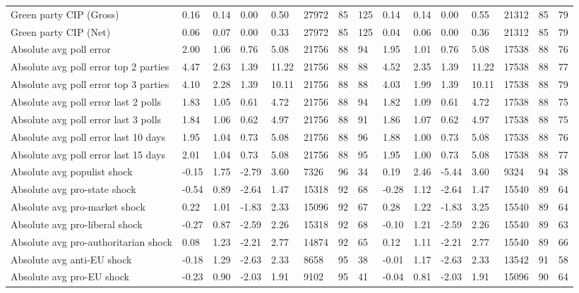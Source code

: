 \begin{longtable}{lllllllllllllll}
\addlinespace
Green party CIP (Gross) & 0.16 & 0.14 & 0.00 & 0.50 & 27972 & 85 & 125 & 0.14 & 0.14 & 0.00 & 0.55 & 21312 & 85 & 79\\
Green party CIP (Net) & 0.06 & 0.07 & 0.00 & 0.33 & 27972 & 85 & 125 & 0.04 & 0.06 & 0.00 & 0.36 & 21312 & 85 & 79\\
Absolute avg poll error & 2.00 & 1.06 & 0.76 & 5.08 & 21756 & 88 & 94 & 1.95 & 1.01 & 0.76 & 5.08 & 17538 & 88 & 76\\
Absolute avg poll error top 2 parties & 4.47 & 2.63 & 1.39 & 11.22 & 21756 & 88 & 88 & 4.52 & 2.35 & 1.39 & 11.22 & 17538 & 88 & 77\\
Absolute avg poll error top 3 parties & 4.10 & 2.28 & 1.39 & 10.11 & 21756 & 88 & 88 & 4.03 & 1.99 & 1.39 & 10.11 & 17538 & 88 & 79\\
\addlinespace
Absolute avg poll error last 2 polls & 1.83 & 1.05 & 0.61 & 4.72 & 21756 & 88 & 94 & 1.82 & 1.09 & 0.61 & 4.72 & 17538 & 88 & 75\\
Absolute avg poll error last 3 polls & 1.84 & 1.06 & 0.62 & 4.97 & 21756 & 88 & 91 & 1.86 & 1.07 & 0.62 & 4.97 & 17538 & 88 & 75\\
Absolute avg poll error last 10 days & 1.95 & 1.04 & 0.73 & 5.08 & 21756 & 88 & 96 & 1.88 & 1.00 & 0.73 & 5.08 & 17538 & 88 & 76\\
Absolute avg poll error last 15 days & 2.01 & 1.04 & 0.73 & 5.08 & 21756 & 88 & 95 & 1.95 & 1.00 & 0.73 & 5.08 & 17538 & 88 & 77\\
Absolute avg populist shock & -0.15 & 1.75 & -2.79 & 3.60 & 7326 & 96 & 34 & 0.19 & 2.46 & -5.44 & 3.60 & 9324 & 94 & 38\\
\addlinespace
Absolute avg pro-state shock & -0.54 & 0.89 & -2.64 & 1.47 & 15318 & 92 & 68 & -0.28 & 1.12 & -2.64 & 1.47 & 15540 & 89 & 64\\
Absolute avg pro-market shock & 0.22 & 1.01 & -1.83 & 2.33 & 15096 & 92 & 67 & 0.28 & 1.22 & -1.83 & 3.25 & 15540 & 89 & 64\\
Absolute avg pro-liberal shock & -0.27 & 0.87 & -2.59 & 2.26 & 15318 & 92 & 68 & -0.10 & 1.21 & -2.59 & 2.26 & 15540 & 89 & 63\\
Absolute avg pro-authoritarian shock & 0.08 & 1.23 & -2.21 & 2.77 & 14874 & 92 & 65 & 0.12 & 1.11 & -2.21 & 2.77 & 15540 & 89 & 66\\
Absolute avg anti-EU shock & -0.18 & 1.29 & -2.63 & 2.33 & 8658 & 95 & 38 & -0.01 & 1.17 & -2.63 & 2.33 & 13542 & 91 & 58\\
\addlinespace
Absolute avg pro-EU shock & -0.23 & 0.90 & -2.03 & 1.91 & 9102 & 95 & 41 & -0.04 & 0.81 & -2.03 & 1.91 & 15096 & 90 & 64\\

\end{longtable}
